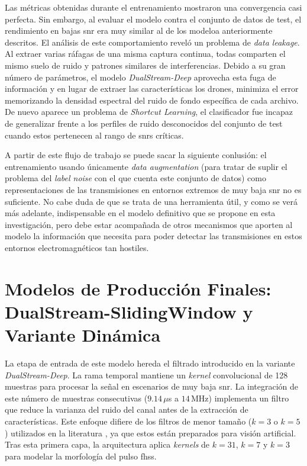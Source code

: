 Las métricas obtenidas durante el entrenamiento mostraron una convergencia casi perfecta. Sin embargo, al evaluar el modelo contra el conjunto de datos de test, el rendimiento en bajas \gls{snr} era muy similar al de los modeloa anteriormente descritos. El análisis de este comportamiento reveló un problema de \textit{data leakage}. Al extraer varias ráfagas de una misma captura continua, todas comparten el mismo suelo de ruido y patrones similares de interferencias. Debido a su gran número de parámetros, el modelo \textit{DualStream-Deep} aprovecha esta fuga de información y en lugar de extraer las características los drones, minimiza el error memorizando la densidad espectral del ruido de fondo específica de cada archivo. De nuevo aparece un problema de \textit{Shortcut Learning}, el clasificador fue incapaz de generalizar frente a los perfiles de ruido desconocidos del conjunto de test cuando estos pertenecen al rango de \gls{snr}s críticas.

A partir de este flujo de trabajo se puede sacar la siguiente conlusión: el entrenamiento usando únicamente \textit{data augmentation} (para tratar de suplir el problema del \textit{label noise} con el que cuenta este conjunto de datos) como representaciones de las transmisiones en entornos extremos de muy baja \gls{snr} no es suficiente. No cabe duda de que se trata de una herramienta útil, y como se verá más adelante, indispensable en el modelo definitivo que se propone en esta investigación, pero debe estar acompañada de otros mecanismos que aporten al modelo la información que necesita para poder detectar las transmisiones en estos entornos electromagnéticos tan hostiles. 


\section{Modelos de Producción Finales: DualStream-SlidingWindow y Variante Dinámica}
\label{sec:dualstream_def}
La etapa de entrada de este modelo hereda el filtrado introducido en la variante \textit{DualStream-Deep}. La rama temporal mantiene un \textit{kernel} convolucional de 128 muestras para procesar la señal en escenarios de muy baja \gls{snr}. La integración de este número de muestras consecutivas ($9.14\,\mu$s a $14$\,MHz) implementa un filtro que reduce la varianza del ruido del canal antes de la extracción de características. Este enfoque difiere de los filtros de menor tamaño ($k=3$ o $k=5$) utilizados en la literatura \cite{gluge_robust_2024}, ya que estos están preparados para visión artificial. Tras esta primera capa, la arquitectura aplica \textit{kernels} de $k=31$, $k=7$ y $k=3$ para modelar la morfología del pulso \gls{fhss}.

